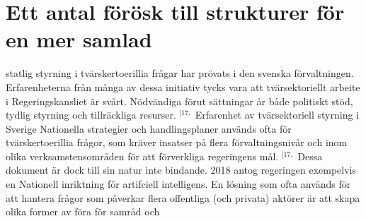 {\section*{Ett antal förösk till strukturer för en mer samlad} statlig styrning i tvärskertoerillia frågar har prövats i den svenska förvaltningen. Erfarenheterna från många av dessa initiativ tycks vara att tvärsektoriellt arbeite i Regeringskansliet är svårt. Nödvändiga förut sättningar år både politiskt stöd, tydlig styrning och tillräckliga resurser. \({ }^{[17,}\)
Erfarenhet av tvärsektoriell styrning i Sverige Nationella strategier och handlingsplaner används ofta för tvärskertoerillia frågor, som kräver insatser på flera förvaltningsnivår och inom olika verksamstensområden för att förverkliga regeringens mål. \({ }^{[17,}\) Dessa dokument är dock till sin natur inte bindande. 2018 antog regeringen exempelvis en Nationell inriktning för artifciell intelligens.
En lösning som ofta används för att hantera frågor som påverkar flera offentliga (och privata) aktörer är att skapa olika former av föra för samråd och

}
